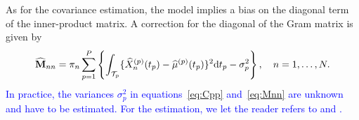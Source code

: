 As for the covariance estimation, the model implies a bias on the diagonal term of the inner-product matrix. A correction for the diagonal of the Gram matrix is given by
\begin{equation}\label{eq:Mnn}
    \widehat{\mathbf{M}}_{nn} = \pi_n\sum_{p = 1}^P \left\{\int_{\mathcal{T}_{p}}\{\widehat{X}_n^{(p)}(t_p) - \widehat{\mu}^{(p)}(t_p)\}^2 {\rm d} t_p - \sigma_p^2 \right\}, \quad n = 1, \dots, N.
\end{equation}
\textcolor{blue}{In practice, the variances $\sigma_p^2$ in equations~\eqref{eq:Cpp} and~\eqref{eq:Mnn} are unknown and have to be estimated. For the estimation, we let the reader refers to \cite{hallVarianceEstimationNonparametric1990} and \cite{hallAsymptoticallyOptimalDifferenceBased1990}.}


